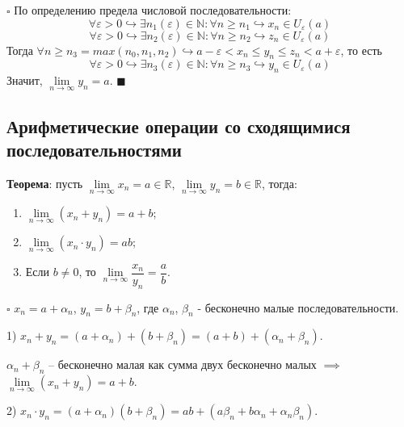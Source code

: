 \documentclass[12pt, a4paper, reqno]{article}
\begin{document}
    $\square$ По определению предела числовой последовательности:
    \begin{equation*}
        \forall \varepsilon > 0 \hookrightarrow \exists n_1(\varepsilon)\in\mathbb{N}: \forall n
        \geq n_1 \hookrightarrow x_n\in U_{\varepsilon}(a)
    \end{equation*}
    \begin{equation*}
        \forall \varepsilon > 0 \hookrightarrow \exists n_2(\varepsilon)\in\mathbb{N}: \forall n
        \geq n_2 \hookrightarrow z_n\in U_{\varepsilon}(a)
    \end{equation*}
    Тогда $\forall n \geq n_3 = max(n_0, n_1, n_2) \hookrightarrow a - \varepsilon < x_n \leq y_n
    \leq z_n < a + \varepsilon$, то есть
    \begin{equation*}
        \forall \varepsilon > 0 \hookrightarrow \exists n_3(\varepsilon)\in\mathbb{N}: \forall n
        \geq n_3 \hookrightarrow y_n\in U_{\varepsilon}(a)
    \end{equation*}
    Значит, $\lim\limits_{n\to\infty} y_n = a$. $\blacksquare$\\

    \subsection{Арифметические операции со сходящимися последовательностями}
    \textbf{Теорема}: пусть $\lim\limits_{n\to\infty} x_n = a\in\mathbb{R}$,
    $\lim\limits_{n\to\infty} y_n = b\in\mathbb{R}$, тогда:
    \begin{enumerate}
        \item $\lim\limits_{n\to\infty} (x_n + y_n) = a + b$;
        \item $\lim\limits_{n\to\infty} (x_n\cdot y_n) = ab$;
        \item Если $b \neq 0$, то $\lim\limits_{n\to\infty} \dfrac{x_n}{y_n} = \dfrac{a}{b}$.
    \end{enumerate}

    $\square$ $x_n = a + \alpha_n$, $y_n = b + \beta_n$, где $\alpha_n$, $\beta_n$ - бесконечно малые
    последовательности.

    1) $x_n + y_n = (a + \alpha_n) + (b + \beta_n) = (a + b) + (\alpha_n + \beta_n)$.

    $\alpha_n + \beta_n$ -- бесконечно малая как сумма двух бесконечно малых
    $\implies$$\lim\limits_{n\to\infty} (x_n + y_n) = a + b$.

    2) $x_n\cdot y_n = (a + \alpha_n)(b + \beta_n) = ab + (a\beta_n + b\alpha_n + \alpha_n\beta_n)$.
\end{document}
